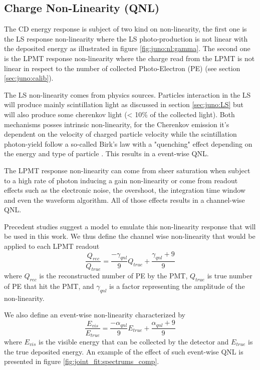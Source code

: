 \documentclass[../main.tex]{subfiles}
\begin{document}
\subsection{Charge Non-Linearity (QNL)}

The CD energy response is subject of two kind on non-linearity, the first one is the LS response non-linearity where the LS photo-production is not linear with the deposited energy as illustrated in figure \ref{fig:juno:nl:gamma}. The second one is the LPMT response non-linearity where the charge read from the LPMT is not linear in respect to the number of collected Photo-Electron (PE) (see section \ref{sec:juno:calib}).

The LS non-linearity comes from physics sources. Particles interaction in the LS will produce mainly scintillation light as discussed in section \ref{sec:juno:LS} but will also produce some cherenkov light (< 10\% of the collected light). Both mechanisms posses intrinsic non-linearity, for the Cherenkov emission it's dependent on the velocity of charged particle velocity while the scintillation photon-yield follow a so-called Birk's law with a "quenching" effect depending on the energy and type of particle \cite{particle_data_group_review_2020}. This results in a event-wise QNL.

The LPMT response non-linearity can come from sheer saturation when subject to a high rate of photon inducing a gain non-linearity or come from readout effects such as the electronic noise, the overshoot, the integration time window and even the waveform algorithm. All of those effects results in a channel-wise QNL.

Precedent studies \cite{han_dual_2021} suggest a model to emulate this non-linearity response that will be used in this work. We thus define the channel wise non-linearity that would be applied to each LPMT readout
\begin{equation}
  \label{eq:joint_fit:gamma_yang}
  \frac{Q_{rec}}{Q_{true}} = \frac{-\gamma_{qnl}}{9} Q_{true} + \frac{\gamma_{qnl} + 9}{9}
\end{equation}
where $Q_{rec}$ is the reconstructed number of PE by the PMT, $Q_{true}$ is true number of PE that hit the PMT, and $\gamma_{qnl}$ is a factor representing the amplitude of the non-linearity.

We also define an event-wise non-linearity characterized by
\begin{equation}
  \label{eq:joint_fit:alpha_yang}
  \frac{E_{vis}}{E_{true}} = \frac{-\alpha_{qnl}}{9} E_{true} + \frac{\alpha_{qnl} + 9}{9}
\end{equation}
where $E_{vis}$ is the visible energy that can be collected by the detector and $E_{true}$ is the true deposited energy. An example of the effect of such event-wise QNL is presented in figure \ref{fig:joint_fit:spectrums_comp}.
\end{document}
